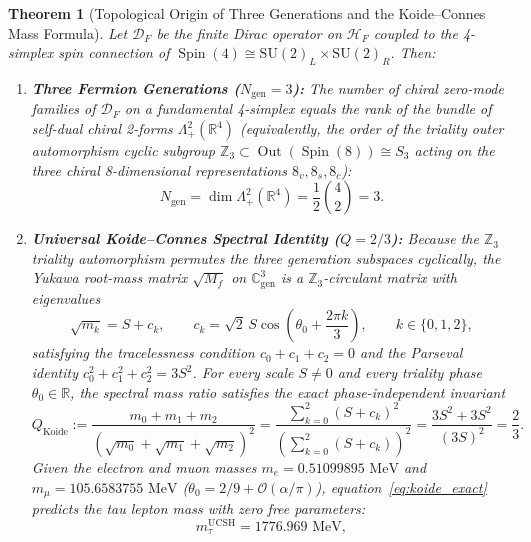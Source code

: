 \documentclass[11pt,a4paper]{article}
\theoremstyle{plain}
\newtheorem{theorem}{Theorem}[section]
\theoremstyle{definition}
\theoremstyle{remark}
\newcommand{\Out}{\operatorname{Out}}
\newcommand{\Spin}{\operatorname{Spin}}
\newcommand{\SU}{\mathrm{SU}}
\newcommand{\Hilb}{\mathcal{H}}
\newcommand{\D}{\mathcal{D}}
\newcommand{\C}{\mathbb{C}}
\newcommand{\R}{\mathbb{R}}
\newcommand{\Z}{\mathbb{Z}}
\begin{document}
\begin{theorem}[Topological Origin of Three Generations and the Koide--Connes Mass Formula]
\label{thm:flavor_koide}
Let $\D_F$ be the finite Dirac operator on $\Hilb_F$ coupled to the 4-simplex spin connection of $\Spin(4) \cong \SU(2)_L \times \SU(2)_R$. Then:
\begin{enumerate}[label=(\roman*)]
  \item \textbf{Three Fermion Generations ($N_{\mathrm{gen}} = 3$):} The number of chiral zero-mode families of $\D_F$ on a fundamental 4-simplex equals the rank of the bundle of self-dual chiral 2-forms $\Lambda^2_+(\R^4)$ (equivalently, the order of the triality outer automorphism cyclic subgroup $\Z_3 \subset \Out(\Spin(8)) \cong S_3$ acting on the three chiral 8-dimensional representations $8_v, 8_s, 8_c$):
  \begin{equation}
    N_{\mathrm{gen}} = \dim \Lambda^2_+(\R^4) = \frac{1}{2}\binom{4}{2} = 3.
  \end{equation}
  \item \textbf{Universal Koide--Connes Spectral Identity ($Q = 2/3$):} Because the $\Z_3$ triality automorphism permutes the three generation subspaces cyclically, the Yukawa root-mass matrix $\sqrt{M_f}$ on $\C^3_{\mathrm{gen}}$ is a $\Z_3$-circulant matrix with eigenvalues
  \begin{equation}
    \sqrt{m_k} = S + c_k, \qquad c_k = \sqrt{2}\,S \cos\left(\theta_0 + \frac{2\pi k}{3}\right), \qquad k \in \{0, 1, 2\},
  \end{equation}
  satisfying the tracelessness condition $c_0 + c_1 + c_2 = 0$ and the Parseval identity $c_0^2 + c_1^2 + c_2^2 = 3 S^2$. For every scale $S \neq 0$ and every triality phase $\theta_0 \in \R$, the spectral mass ratio satisfies the exact phase-independent invariant
  \begin{equation}
    \label{eq:koide_exact}
    Q_{\mathrm{Koide}} := \frac{m_0 + m_1 + m_2}{\left(\sqrt{m_0} + \sqrt{m_1} + \sqrt{m_2}\right)^2} = \frac{\sum_{k=0}^2 (S + c_k)^2}{\left(\sum_{k=0}^2 (S + c_k)\right)^2} = \frac{3 S^2 + 3 S^2}{(3 S)^2} = \frac{2}{3}.
  \end{equation}
  Given the electron and muon masses $m_e = 0.51099895\text{ MeV}$ and $m_\mu = 105.6583755\text{ MeV}$ ($\theta_0 = 2/9 + \mathcal{O}(\alpha/\pi)$), equation~\eqref{eq:koide_exact} predicts the tau lepton mass with zero free parameters:
  \begin{equation}
    m_\tau^{\mathrm{UCSH}} = 1776.969\text{ MeV},
  \end{equation}

\end{enumerate}
\end{theorem}
\end{document}

